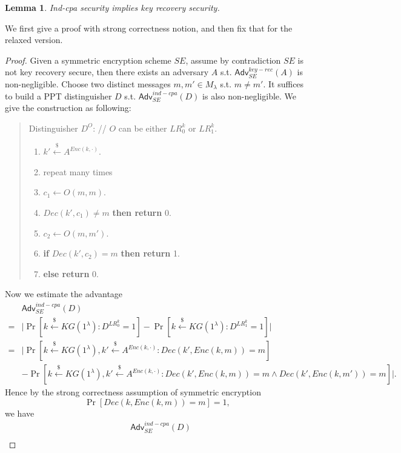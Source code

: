 \documentclass[12pt]{article}
\newcommand{\getsr}{\stackrel{\$}{\gets}}
\newcommand{\Adv}{\textsf{Adv}}
\newcommand{\tab}{\hspace{0.3in}}
\newtheorem{lemma}[theorem]{Lemma}
\theoremstyle{definition}
\begin{document}
\begin{lemma}
Ind-cpa security implies key recovery security.
\end{lemma}
We first give a proof with strong correctness notion, and then fix that for the relaxed version.
\begin{proof}
Given a symmetric encryption scheme $SE$, assume by contradiction $SE$ is not key recovery secure, then there exists an adversary $A$ s.t. $\Adv_{SE}^{key-rec}(A)$ is non-negligible. Choose two distinct messages $m, m' \in M_\lambda$ s.t. $m \not= m'$. It suffices to build a PPT distinguisher $D$ s.t. $\Adv_{SE}^{ind-cpa}(D)$ is also non-negligible. We give the construction as following:
\begin{quote}
Distinguisher $D^O$: // $O$ can be either $LR_0^k$ or $LR_1^k$.
\begin{enumerate}
\item $k' \getsr A^{Enc(k,\cdot)}$.
\item repeat many times
\item \tab $c_1 \gets O(m, m)$. 
\item \tab {\bf if} $Dec(k', c_1) \not= m$ {\bf then return} 0.
\item $c_2 \gets O(m, m')$.
\item {\bf if} $Dec(k', c_2) = m$ {\bf then return} 1.
\item {\bf else return} 0.
\end{enumerate}
\end{quote}
Now we estimate the advantage
$$\begin{aligned}
&\Adv_{SE}^{ind-cpa}(D) \\
=& \bigg| \Pr[k \getsr KG(1^\lambda) : D^{LR_0^k}=1] - \Pr[k \getsr KG(1^\lambda) : D^{LR_1^k}=1] \bigg| \\
=& \bigg| \Pr[k \getsr KG(1^\lambda), k' \getsr A^{Enc(k,\cdot)}: Dec(k', Enc(k, m))=m] \\
&-\Pr[k \getsr KG(1^\lambda), k' \getsr A^{Enc(k,\cdot)}: Dec(k', Enc(k, m))=m \wedge Dec(k', Enc(k, m'))=m] \bigg|.
\end{aligned}$$
Hence by the strong correctness assumption of symmetric encryption 
$$\Pr[Dec(k, Enc(k, m))=m]=1,$$ 
we have
$$\begin{aligned}
&\Adv_{SE}^{ind-cpa}(D) \\

\end{aligned}$$
\end{proof}
\end{document}
